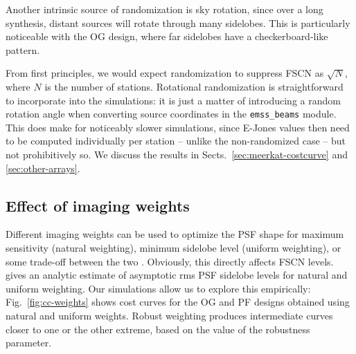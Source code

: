 \documentclass{aa}
\begin{document}
Another intrinsic source of randomization is sky rotation, since over a long synthesis, distant sources will rotate through many sidelobes. This is particularly noticeable with the OG design, where far sidelobes have a checkerboard-like pattern. 

From first principles, we would expect randomization to suppress FSCN as $\sqrt{N}$, where $N$ is the number of stations. Rotational randomization is straightforward to incorporate into the simulations: it is just a matter of introducing a random rotation angle when converting source coordinates in the {\tt emss\_beams} module. This does make for noticeably slower simulations, since E-Jones values then need to be computed individually per station -- unlike the non-randomized case -- but not prohibitively so. We discuss the results in Sects.~\ref{sec:meerkat-costcurve} and \ref{sec:other-arrays}.

\subsection{Effect of imaging weights}
\label{sec:img-weights}

Different imaging weights can be used to optimize the PSF shape for maximum sensitivity (natural weighting), minimum sidelobe level (uniform weighting), or some trade-off between the two \citep[robust or Briggs weighting:][]{briggs-thesis}. Obviously, this directly affects FSCN levels. \citet{SKA49} gives an analytic estimate of asymptotic rms PSF sidelobe levels for natural and uniform weighting. Our simulations allow us to explore this empirically: Fig.~\ref{fig:cc-weights} shows cost curves for the OG and PF designs obtained using natural and uniform weights. Robust weighting produces intermediate curves closer to one or the other extreme, based on the value of the robustness parameter.
\end{document}
